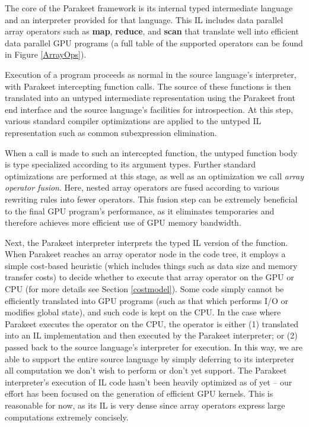 \documentclass[preprint]{sigplanconf}
\begin{document}
The core of the Parakeet framework is its internal typed intermediate language and an interpreter provided for that language. This IL includes data parallel array operators such as \textbf{map}, \textbf{reduce}, and \textbf{scan} that translate well into efficient data parallel GPU programs (a full table of the supported operators can be found in Figure \ref{ArrayOps}).

Execution of a program proceeds as normal in the source language's interpreter, with Parakeet intercepting function calls.  The source of these functions is then translated into an untyped intermediate representation using the Parakeet front end interface and the source language's facilities for introspection. At this step, various standard compiler optimizations are applied to the untyped IL representation such as common subexpression elimination.

When a call is made to such an intercepted function, the untyped function body is type specialized according to its argument types.  Further standard optimizations are performed at this stage, as well as an optimization we call \emph{array operator fusion}.  Here, nested array operators are fused according to various rewriting rules into fewer operators. This fusion step can be extremely beneficial to the final GPU program's performance, as it eliminates temporaries and therefore achieves more efficient use of GPU memory bandwidth.

Next, the Parakeet interpreter interprets the typed IL version of the function.  When Parakeet reaches an array operator node in the code tree, it employs a simple cost-based heuristic (which includes things such as data size and memory transfer costs) to decide whether to execute that array operator on the GPU or CPU (for more details see Section \ref{costmodel}).  Some code simply cannot be efficiently translated into GPU programs (such as that which performs I/O or modifies global state), and such code is kept on the CPU. In the case where Parakeet executes the operator on the CPU, the operator is either (1) translated into an IL implementation and then executed by the Parakeet interpreter; or (2) passed back to the source language's interpreter for execution. In this way, we are able to support the entire source language by simply deferring to its interpreter all computation we don't wish to perform or don't yet support. The Parakeet interpreter's execution of IL code hasn't been heavily optimized as of yet -- our effort has been focused on the generation of efficient GPU kernels.  This is reasonable for now, as its IL is very dense since array operators express large computations extremely concisely.
\end{document}
